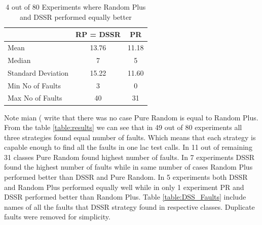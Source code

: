\documentclass[conference]{IEEEtran}
\begin{document}

\begin{table}[H]
\caption{4 out of 80 Experiments where Random Plus and DSSR performed equally better}
\centering
\begin{tabular}{|l|c|c|}
\hline\hline
 				& RP = DSSR			&  PR \\[1ex]
\hline
Mean  			&    13.76				&  11.18\\
Median 			&    7 				&  5\\
Standard Deviation 	&    15.22				&  11.60\\
Min No of Faults	&    3					&  0\\
Max No of Faults 	&    40				&  31\\
\hline
\end{tabular}
\label{table:result4}
\end{table}





Note mian ( write that there was no case Pure Random is equal to Random Plus.\\


From the table \ref{table:results} we can see that in 49 out of 80 experiments all three strategies found equal number of faults. Which means that each strategy is capable enough to find all the faults in one lac test calls. In 11 out of remaining 31 classes Pure Random found highest number of faults. In 7 experiments DSSR found the highest number of faults while in same number of cases Random Plus performed better than DSSR and Pure Random. In 5 experiments both DSSR and Random Plus performed equally well while in only 1 experiment PR and DSSR performed better than Random Plus. 
Table \ref{table:DSS_Faults} include names of all the faults that DSSR strategy found in respective classes. Duplicate faults were removed for simplicity.




\end{document}
